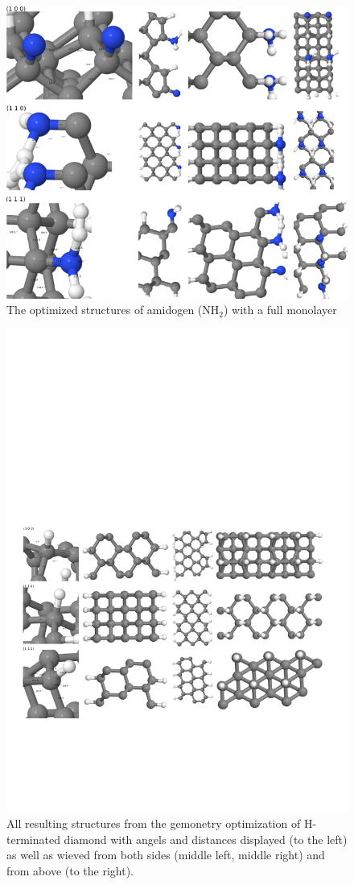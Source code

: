 \documentclass[12pt,a4paper]{article}
\begin{document}
\begin{figure} \captionsetup{width=.8\linewidth} \caption{The optimized structures of amidogen (NH$_2$) with a full monolayer} \label{NH2_summary_half}
\includegraphics[width=.8\linewidth]{pictures/NH2_summary_half.png}
\end{figure}

\begin{figure} \captionsetup{width=.8\linewidth} \caption{All resulting structures from the gemonetry optimization of H-terminated diamond with angels and distances displayed (to the left) as well as wieved from both sides (middle left, middle right) and from above (to the right).} \label{H_terminated}
%
\includegraphics[width=.8\linewidth]{pictures/H_terminated2.png}
\end{figure}
\end{document}
